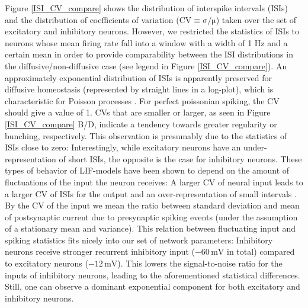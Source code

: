 \documentclass[10pt,a4paper]{article}
\begin{document}
Figure \ref{ISI_CV_compare} shows the distribution of interspike intervals (ISIs) and the distribution of coefficients of variation ($\mathrm{CV\equiv\sigma/\mu}$) taken over the set of excitatory and inhibitory neurons. However, we restricted the statistics of ISIs to neurons whose mean firing rate fall into a window with a width of 1 Hz and a certain mean in order to provide comparability between the ISI distributions in the diffusive/non-diffusive case (see legend in Figure \ref{ISI_CV_compare}). An approximately exponential distribution of ISIs is apparently preserved for diffusive homeostasis (represented by straight lines in a log-plot), which is characteristic for Poisson processes \cite[p. 27]{Theor_Neur_Dayan}. For perfect poissonian spiking, the CV should give a value of 1. CVs that are smaller or larger, as seen in Figure \ref{ISI_CV_compare} B/D, indicate a tendency towards greater regularity or bunching, respectively. This observation is presumably due to the statistics of ISIs close to zero: Interestingly, while excitatory neurons have an  under-representation of short ISIs, the opposite is the case for inhibitory neurons. These types of behavior of LIF-models have been shown to depend on the amount of fluctuations of the input the neuron receives: A larger CV of neural input leads to a larger CV of ISIs for the output and an over-representation of small intervals \cite{Ostojic2011}. By the CV of the input we mean the ratio between standard deviation and mean of postsynaptic current due to presynaptic spiking events (under the assumption of a stationary mean and variance). This relation between fluctuating input and spiking statistics fits nicely into our set of network parameters: Inhibitory neurons receive stronger recurrent inhibitory input ($\mathrm{-60\,mV}$ in total) compared to excitatory neurons ($\mathrm{-12\,mV}$). This lowers the signal-to-noise ratio for the inputs of inhibitory neurons, leading to the aforementioned statistical differences. Still, one can observe a dominant exponential component for both excitatory and inhibitory neurons.
\end{document}
